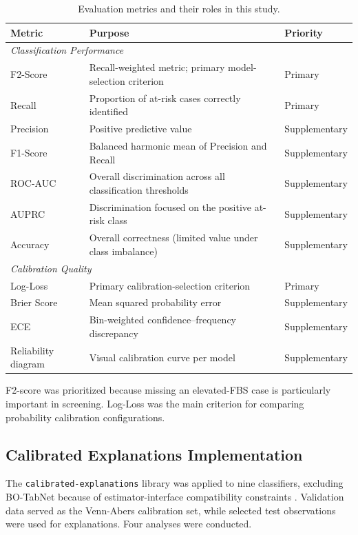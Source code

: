 \begin{table}[H]
\centering
\caption{Evaluation metrics and their roles in this study.}
\label{tab:metrics_roles}
\begin{tabular}{p{3.3cm}p{6.8cm}l}
\hline
\textbf{Metric} & \textbf{Purpose} & \textbf{Priority} \\
\hline
\multicolumn{3}{l}{\textit{Classification Performance}} \\
F2-Score & Recall-weighted metric; primary model-selection criterion & Primary \\
Recall & Proportion of at-risk cases correctly identified & Primary \\
Precision & Positive predictive value & Supplementary \\
F1-Score & Balanced harmonic mean of Precision and Recall & Supplementary \\
ROC-AUC & Overall discrimination across all classification thresholds & Supplementary \\
AUPRC & Discrimination focused on the positive at-risk class & Supplementary \\
Accuracy & Overall correctness (limited value under class imbalance) & Supplementary \\
\hline
\multicolumn{3}{l}{\textit{Calibration Quality}} \\
Log-Loss & Primary calibration-selection criterion & Primary \\
Brier Score & Mean squared probability error & Supplementary \\
ECE & Bin-weighted confidence--frequency discrepancy & Supplementary \\
Reliability diagram & Visual calibration curve per model & Supplementary \\
\hline
\end{tabular}
\end{table}

F2-score was prioritized because missing an elevated-FBS case is particularly important in screening. Log-Loss was the main criterion for comparing probability calibration configurations.

\subsection{Calibrated Explanations Implementation}

The \texttt{calibrated-explanations} library was applied to nine classifiers, excluding BO-TabNet because of estimator-interface compatibility constraints \cite{lofstrom_ce_2024}. Validation data served as the Venn-Abers calibration set, while selected test observations were used for explanations. Four analyses were conducted.

